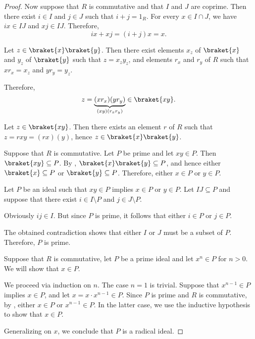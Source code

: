 \begin{proof}
  Now suppose that \( R \) is commutative and that \( I \) and \( J \) are coprime. Then there exist \( i \in I \) and \( j \in J \) such that \( i + j = 1_R \). For every \( x \in I \cap J \), we have \( ix \in IJ \) and \( xj \in IJ \). Therefore,
  \begin{equation*}
    ix + xj = (i + j)x = x.
  \end{equation*}

  \SufficiencySubProof* Let \( z \in \braket{x} \braket{y} \). Then there exist elements \( x_z \) of \( \braket{x} \) and \( y_z \) of \( \braket{y} \) such that \( z = x_z y_z \), and elements \( r_x \) and \( r_y \) of \( R \) such that \( x r_x = x_z \) and \( y r_y = y_z \).

  Therefore,
  \begin{equation*}
    z = \underbrace{(x r_x) (y r_y)}_{(xy) (r_x r_y)} \in \braket{xy}.
  \end{equation*}

  \NecessitySubProof* Let \( z \in \braket{xy} \). Then there exists an element \( r \) of \( R \) such that \( z = rxy = (rx)(y) \), hence \( z \in \braket{x} \braket{y} \).

   Suppose that \( R \) is commutative.
  \SufficiencySubProof* Let \( P \) be prime and let \( xy \in P \). Then \( \braket{xy} \subseteq P \). By , \( \braket{x} \braket{y} \subseteq P \), and hence either \( \braket{x} \subseteq P \) or \( \braket{y} \subseteq P \). Therefore, either \( x \in P \) or \( y \in P \).

  \NecessitySubProof* Let \( P \) be an ideal such that \( xy \in P \) implies \( x \in P \) or \( y \in P \). Let \( IJ \subseteq P \) and suppose that there exist \( i \in I \setminus P \) and \( j \in J \setminus P \).

  Obviously \( ij \in I \). But since \( P \) is prime, it follows that either \( i \in P \) or \( j \in P \).

  The obtained contradiction shows that either \( I \) or \( J \) must be a subset of \( P \). Therefore, \( P \) is prime.

   Suppose that \( R \) is commutative, let \( P \) be a prime ideal and let \( x^n \in P \) for \( n > 0 \). We will show that \( x \in P \).

  We proceed via induction on \( n \). The case \( n = 1 \) is trivial. Suppose that \( x^{n-1} \in P \) implies \( x \in P \), and let \( x = x \cdot x^{n-1} \in P \). Since \( P \) is prime and \( R \) is commutative, by , either \( x \in P \) or \( x^{n-1} \in P \). In the latter case, we use the inductive hypothesis to show that \( x \in P \).

  Generalizing on \( x \), we conclude that \( P \) is a radical ideal.
\end{proof}

